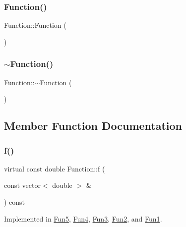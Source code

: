 \mbox{\label{class_function_ae206568fd4fd4c885e3ccff76345c4e6}} 
\subsubsection{\texorpdfstring{Function()}{Function()}\hspace{0.1cm}{\footnotesize\ttfamily [2/2]}}
{\footnotesize\ttfamily Function\+::\+Function (\begin{DoxyParamCaption}{ }\end{DoxyParamCaption})}

\mbox{\label{class_function_a3b03f7cf0b75d16edebdda1dee1db6fd}} 
\subsubsection{\texorpdfstring{$\sim$\+Function()}{~Function()}}
{\footnotesize\ttfamily Function\+::$\sim$\+Function (\begin{DoxyParamCaption}{ }\end{DoxyParamCaption})}



\subsection{Member Function Documentation}
\mbox{\label{class_function_a81ec299f137e34109246cde88d88c949}} 
\subsubsection{\texorpdfstring{f()}{f()}}
{\footnotesize\ttfamily virtual const double Function\+::f (\begin{DoxyParamCaption}\item[{const vector$<$ double $>$ \&}]{ }\end{DoxyParamCaption}) const\hspace{0.3cm}{\ttfamily [pure virtual]}}



Implemented in \hyperlink{class_fun5_ae85d60bda47bb388c18723e4e887d409}{Fun5}, \hyperlink{class_fun4_a6d02fcaf80b0baa15b2828afb19dee12}{Fun4}, \hyperlink{class_fun3_ad0ed4dd48ce5107560db42959f57f1f5}{Fun3}, \hyperlink{class_fun2_a6e9544da42cee65e9cbc8b56b233877c}{Fun2}, and \hyperlink{class_fun1_adbd9aa971a649a7b6eda8fb6806a8498}{Fun1}.

